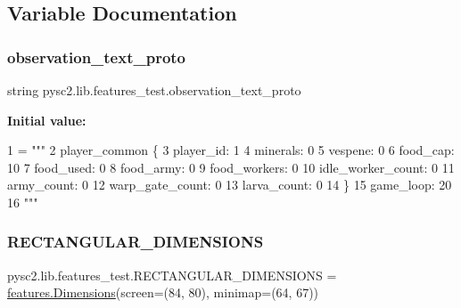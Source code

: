 \subsection{Variable Documentation}
\mbox{\label{namespacepysc2_1_1lib_1_1features__test_adce0a02e86e8ca843a83f901dbb707fc}} 
\subsubsection{\texorpdfstring{observation\+\_\+text\+\_\+proto}{observation\_text\_proto}}
{\footnotesize\ttfamily string pysc2.\+lib.\+features\+\_\+test.\+observation\+\_\+text\+\_\+proto}

{\bfseries Initial value\+:}
\begin{DoxyCode}
1 =  \textcolor{stringliteral}{"""}
2 \textcolor{stringliteral}{player\_common \{}
3 \textcolor{stringliteral}{  player\_id: 1}
4 \textcolor{stringliteral}{  minerals: 0}
5 \textcolor{stringliteral}{  vespene: 0}
6 \textcolor{stringliteral}{  food\_cap: 10}
7 \textcolor{stringliteral}{  food\_used: 0}
8 \textcolor{stringliteral}{  food\_army: 0}
9 \textcolor{stringliteral}{  food\_workers: 0}
10 \textcolor{stringliteral}{  idle\_worker\_count: 0}
11 \textcolor{stringliteral}{  army\_count: 0}
12 \textcolor{stringliteral}{  warp\_gate\_count: 0}
13 \textcolor{stringliteral}{  larva\_count: 0}
14 \textcolor{stringliteral}{\}}
15 \textcolor{stringliteral}{game\_loop: 20}
16 \textcolor{stringliteral}{"""}
\end{DoxyCode}
\mbox{\label{namespacepysc2_1_1lib_1_1features__test_ae8989bfb42e5bf07b18085dd10a25410}} 
\subsubsection{\texorpdfstring{R\+E\+C\+T\+A\+N\+G\+U\+L\+A\+R\+\_\+\+D\+I\+M\+E\+N\+S\+I\+O\+NS}{RECTANGULAR\_DIMENSIONS}}
{\footnotesize\ttfamily pysc2.\+lib.\+features\+\_\+test.\+R\+E\+C\+T\+A\+N\+G\+U\+L\+A\+R\+\_\+\+D\+I\+M\+E\+N\+S\+I\+O\+NS = \mbox{\hyperlink{classpysc2_1_1lib_1_1features_1_1_dimensions}{features.\+Dimensions}}(screen=(84, 80), minimap=(64, 67))}

